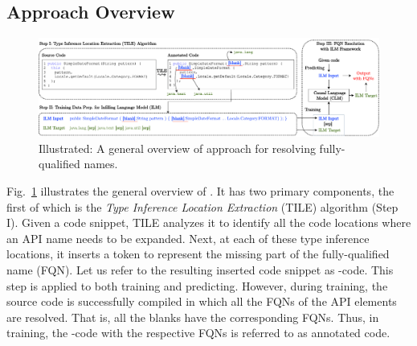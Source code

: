 \subsection{Approach Overview}
\label{sec:overview}

\begin{figure}[t]
 \centering
 \includegraphics[width=.98\textwidth]{overview-ilm-2.pdf}
 \caption{Illustrated: A general overview of \tool approach for resolving fully-qualified names.}
 \label{fig:approach}
\end{figure}


Fig.~\ref{fig:approach} illustrates the general overview of
{\tool}. It has two primary components, the first of which is the {\em
  Type Inference Location Extraction} (TILE) algorithm (Step I). Given
a code snippet, TILE analyzes it to identify all the code locations
where an API name needs to be expanded. Next, at each of these type
inference locations, it inserts a  token to represent
the missing part of the fully-qualified name (FQN). Let us refer to
the resulting  inserted code snippet as
-code. This step is applied to both training and
predicting. However, during training, the source code is successfully
compiled in which all the FQNs of the API elements are resolved. That
is, all the blanks have the corresponding FQNs. Thus, in training, the
-code with the respective FQNs is referred to as
annotated code.


